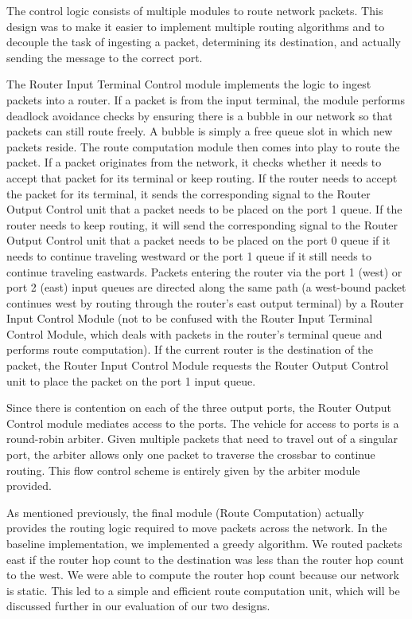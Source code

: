 \documentclass[10pt]{article}
\begin{document}
The control logic consists of multiple modules to route network packets.
This design was to make it easier to implement multiple routing algorithms
and to decouple the task of ingesting a packet, determining its destination,
and actually sending the message to the correct port. \par
The Router Input Terminal Control module implements the logic to ingest packets into
a router. 
If a packet is from the input terminal, the module performs deadlock avoidance 
checks by ensuring there is a bubble in our network so that packets can still
route freely.
A bubble is simply a free queue slot in which new packets reside.
The route computation module then comes into play to route the packet.
If a packet originates from the network, it checks whether it needs to accept
that packet for its terminal or keep routing. 
If the router needs to accept the packet for its terminal, it sends the
corresponding signal to the Router Output Control unit that a packet needs to 
be placed on the port 1 queue. 
If the router needs to keep routing, it will send the corresponding signal to
the Router Output Control unit that a packet needs to be placed on the port 0
queue if it needs to continue traveling westward or the port 1 queue if it 
still needs to continue traveling eastwards.
Packets entering the router via the port 1 (west) or port 2 (east) input queues
are directed along the same path (a west-bound packet continues west by routing through
the router's east output terminal) by a Router Input Control Module (not to be 
confused with the Router Input Terminal Control Module, which deals with packets
 in the router's terminal queue and performs route computation). If the current 
 router is the destination of the packet, the Router Input Control Module requests
 the Router Output Control unit to place the packet on the port 1 input queue.  \par

Since there is contention on each of the three output ports, the 
Router Output Control module mediates access to the ports. 
The vehicle for access to ports is a round-robin arbiter. 
Given multiple packets that need to travel out of a singular port, the arbiter
allows only one packet to traverse the crossbar to continue routing. 
This flow control scheme is entirely given by the arbiter module provided. \par

As mentioned previously, the final module (Route Computation) actually provides
the routing logic required to move packets across the network.
In the baseline implementation, we implemented a greedy algorithm.
We routed packets east if the router hop count to the destination was less than
the router hop count to the west. 
We were able to compute the router hop count because our network is static. 
This led to a simple and efficient route computation unit, which will be 
discussed further in our evaluation of our two designs.
\end{document}
